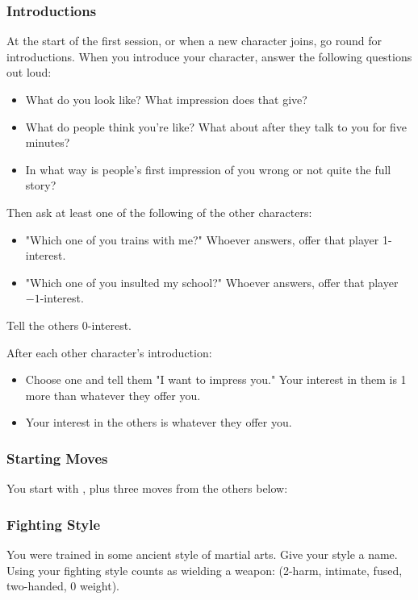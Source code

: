 \subsubsection{Introductions}
At the start of the first session, or when a new character joins, go round for introductions.
When you introduce your character, answer the following questions out loud:
\begin{itemize}
\item What do you look like? What impression does that give?
\item What do people think you're like? What about after they talk to you for five minutes?
\item In what way is people's first impression of you wrong or not quite the full story?
\end{itemize}

Then ask at least one of the following of the other characters:
\begin{itemize}
\item "Which one of you trains with me?" Whoever answers, offer that player 1-interest.
\item "Which one of you insulted my school?" Whoever answers, offer that player $-1$-interest.
\end{itemize}
Tell the others 0-interest.

After each other character's introduction:
\begin{itemize}
\item Choose one and tell them "I want to impress you." Your interest in them is 1 more than whatever they offer you.
\item Your interest in the others is whatever they offer you.
\end{itemize}

\subsubsection{Starting Moves}
You start with , plus three moves from the others below:


\subsubsection{Fighting Style}
You were trained in some ancient style of martial arts. Give your style a name.
Using your fighting style counts as wielding a weapon: (2-harm, intimate, fused, two-handed, 0 weight).

